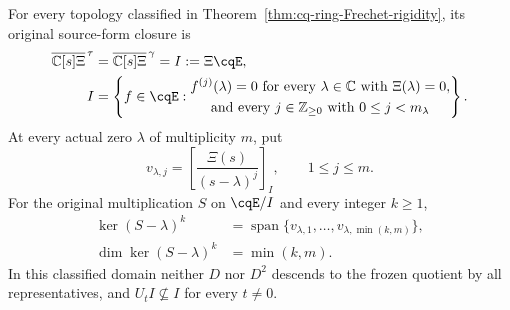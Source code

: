 \begin{cqproposition}
\label{thm:cq-ring-classified-closure}
For every topology classified in
Theorem~\ref{thm:cq-ring-Frechet-rigidity}, its original
source-form closure is
\begin{equation}
 \begin{aligned}
 \overline{\mathbb C[s]\Xi}^{\,\tau}
 &=\overline{\mathbb C[s]\Xi}^{\,\gamma}=I:=\Xi\cqE,\\
 I&=\left\{f\in\cqE:\begin{gathered}
 f^{(j)}(\lambda)=0\text{ for every }\lambda\in\mathbb C
                      \text{ with }\Xi(\lambda)=0,\\
 \text{and every }j\in\mathbb Z_{\geq0}\text{ with }0\leq j<m_\lambda
 \end{gathered}\right\}.
 \end{aligned}
 \label{eq:cq-ring-classified-closure}
\end{equation}
At every actual zero $\lambda$ of multiplicity $m$, put
\[
 v_{\lambda,j}=\left[\frac{\Xi(s)}{(s-\lambda)^j}\right]_I,
 \qquad 1\leq j\leq m.
\]
For the original multiplication $S$ on $\cqE/I$ and every integer $k\geq1$,
\begin{equation}
 \begin{aligned}
 \ker(S-\lambda)^k
 &=\operatorname{span}\{v_{\lambda,1},\ldots,
                  v_{\lambda,\min(k,m)}\},\\
 \dim\ker(S-\lambda)^k&=\min(k,m).
 \end{aligned}
 \label{eq:cq-ring-full-generalized-block}
\end{equation}
In this classified domain neither $D$ nor $D^2$ descends
to the frozen quotient by all representatives, and
$U_tI\nsubseteq I$ for every $t\ne0$.
\end{cqproposition}
